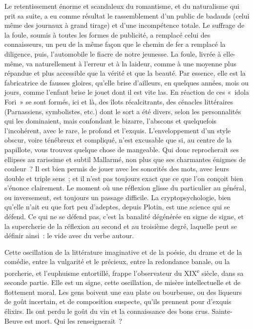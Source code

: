 \documentclass[french,twoside]{book} %
\begin{document}
Le retentissement énorme et scandaleux du romantisme, et du naturalisme qui prit sa suite, a eu comme résultat le rassemblement d’un public de badauds (celui même des journaux à grand tirage) et d’une incompétence totale. Le suffrage de la foule, soumis à toutes les formes de publicité, a remplacé celui des connaisseurs, un peu de la même façon que le chemin de fer a remplacé la diligence, puis, l’automobile le fiacre de notre jeunesse. La foule, livrée à elle-même, va naturellement à l’erreur et à la laideur, comme à une moyenne plus répandue et plus accessible que la vérité et que la beauté. Par essence, elle est la fabricatrice de fausses gloires, qu’elle brise d’ailleurs, en quelques années, mois ou jours, comme l’enfant brise le jouet dont il est vite las. En réaction de ces « idola Fori » se sont formés, ici et là, des îlots récalcitrants, des cénacles littéraires (Parnassiens, symbolistes, etc.) dont le sort a été divers, selon les personnalités qui les dominaient, mais confondant le bizarre, l’abscons et quelquefois l’incohérent, avec le rare, le profond et l’exquis. L’enveloppement d’un style obscur, voire ténébreux et compliqué, n’est excusable que si, au centre de la papillote, vous trouvez quelque chose de mangeable. Qui donc reprocherait ses ellipses au rarissime et subtil Mallarmé, non plus que ses charmantes énigmes de couleur ? Il est bien permis de jouer avec les sonorités des mots, avec leurs double et triple sens ; et il n’est pas toujours exact que ce que l’on conçoit bien s’énonce clairement. Le moment où une réflexion glisse du particulier au général, ou inversement, est toujours un passage difficile. La cryptopsychologie, bien qu’elle n’ait eu que fort peu d’adeptes, depuis Plotin, est une science qui se défend. Ce qui ne se défend pas, c’est la banalité dégénérée en signe de signe, et la supercherie de la réflexion au second et au troisième degré, laquelle peut se définir ainsi : le vide avec du verbe autour.\par
Cette oscillation de la littérature imaginative et de la poésie, du drame et de la comédie, entre la vulgarité et le précieux, entre la redondance banale, ou la porcherie, et l’euphuisme entortillé, frappe l’observateur du XIX\textsuperscript{e} siècle, dans sa seconde partie. Elle est un signe, cette oscillation, de misère intellectuelle et de flottement moral. Les gens boivent une eau plate ou bourbeuse, ou des liqueurs de goût incertain, et de composition suspecte, qu’ils prennent pour d’exquis élixirs. Ils ont perdu le goût du vin et la connaissance des bons crus. Sainte-Beuve est mort. Qui les renseignerait ?\par
\end{document}
